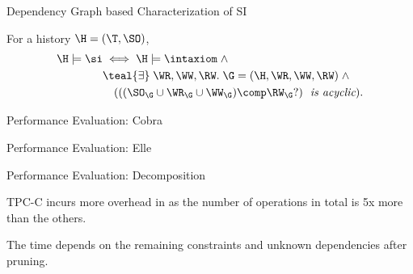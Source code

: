 \begin{frame}{Dependency Graph based Characterization of SI}
  \begin{theorem}
		For a history \emph{$\H = (\T, \SO)$},
		\vspace{-0.30cm}
		\begin{align*}
			\H \models \si & \iff \H \models \intaxiom \;\land \\
				&\teal{\exists}\; \WR, \WW, \RW.\; \G = (\H, \WR, \WW, \RW) \;\land \\
				&\quad ({((\SO_{\G} \cup \WR_{\G} \cup \WW_{\G}) \comp \RW_{\G}?)} \text{\it\; is acyclic}).
		\end{align*}
  \end{theorem}
\end{frame}

\begin{frame}{Performance Evaluation: Cobra}
\end{frame}

\begin{frame}{Performance Evaluation: Elle}
\end{frame}

\begin{frame}{Performance Evaluation: Decomposition}
	\begin{center}
		TPC-C incurs more overhead in 
		as the number of operations in total is 5x more than the others.

		\vspace{0.30cm}
		\vspace{0.20cm}

		The  time depends on the remaining constraints
		and unknown dependencies {after pruning}.
	\end{center}
\end{frame}
